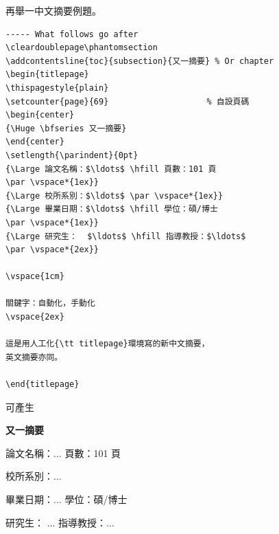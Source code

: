 \begin{appendB}
再舉一中文摘要例題。

\begin{Verbatim}[frame=single,firstline=1,lastline=30,rulecolor=\color{red},label=Another abstract]
----- What follows go after 
\cleardoublepage\phantomsection
\addcontentsline{toc}{subsection}{又一摘要} % Or chapter
\begin{titlepage}
\thispagestyle{plain}
\setcounter{page}{69}                    % 自設頁碼
\begin{center}
{\Huge \bfseries 又一摘要}
\end{center}
\setlength{\parindent}{0pt}
{\Large 論文名稱：$\ldots$ \hfill 頁數：101 頁
\par \vspace*{1ex}}
{\Large 校所系別：$\ldots$ \par \vspace*{1ex}}
{\Large 畢業日期：$\ldots$ \hfill 學位：碩/博士 
\par \vspace*{1ex}}
{\Large 研究生：  $\ldots$ \hfill 指導教授：$\ldots$ 
\par \vspace*{2ex}}

\vspace{1cm}

關鍵字：自動化，手動化
\vspace{2ex}

這是用人工化{\tt titlepage}環境寫的新中文摘要，
英文摘要亦同。

\end{titlepage}
\end{Verbatim}

可產生

\cleardoublepage{}
{}  %
\begin{titlepage}
\thispagestyle{plain}
\setcounter{page}{69}                                %
\begin{center}
{\Huge \bfseries 又一摘要}
\end{center}
\setlength{\parindent}{0pt}
{\Large 論文名稱：$\ldots$ \hfill 頁數：101 頁
\par \vspace*{1ex}}
{\Large 校所系別：$\ldots$ \par \vspace*{1ex}}
{\Large 畢業日期：$\ldots$ \hfill 學位：碩/博士 \par \vspace*{1ex}}
{\Large 研究生：    $\ldots$ \hfill 指導教授：$\ldots$ \par \vspace*{2ex}}


\end{titlepage}
\end{appendB}
